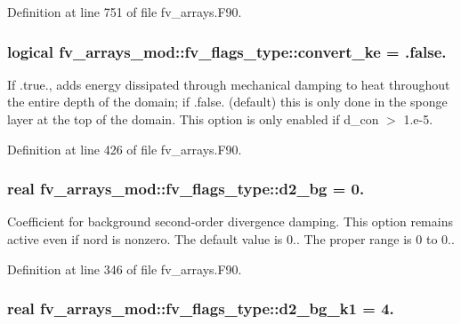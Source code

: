 Definition at line 751 of file fv\-\_\-arrays.\-F90.

\subsubsection[{convert\-\_\-ke}]{\setlength{\rightskip}{0pt plus 5cm}logical fv\-\_\-arrays\-\_\-mod\-::fv\-\_\-flags\-\_\-type\-::convert\-\_\-ke = .false.}\label{structfv__arrays__mod_1_1fv__flags__type_a5facb1d2f072eb7a3c2d20b3b03bb068}


If .true., adds energy dissipated through mechanical damping to heat throughout the entire depth of the domain; if .false. (default) this is only done in the sponge layer at the top of the domain. This option is only enabled if d\-\_\-con $>$ 1.\-e-\/5. 



Definition at line 426 of file fv\-\_\-arrays.\-F90.

\subsubsection[{d2\-\_\-bg}]{\setlength{\rightskip}{0pt plus 5cm}real fv\-\_\-arrays\-\_\-mod\-::fv\-\_\-flags\-\_\-type\-::d2\-\_\-bg = 0.}\label{structfv__arrays__mod_1_1fv__flags__type_a75c65cca32e02f409074fd22c3e13752}


Coefficient for background second-\/order divergence damping. This option remains active even if nord is nonzero. The default value is 0.. The proper range is 0 to 0.. 



Definition at line 346 of file fv\-\_\-arrays.\-F90.

\subsubsection[{d2\-\_\-bg\-\_\-k1}]{\setlength{\rightskip}{0pt plus 5cm}real fv\-\_\-arrays\-\_\-mod\-::fv\-\_\-flags\-\_\-type\-::d2\-\_\-bg\-\_\-k1 = 4.}\label{structfv__arrays__mod_1_1fv__flags__type_a737de90ac392b70940b9279692e09107}


